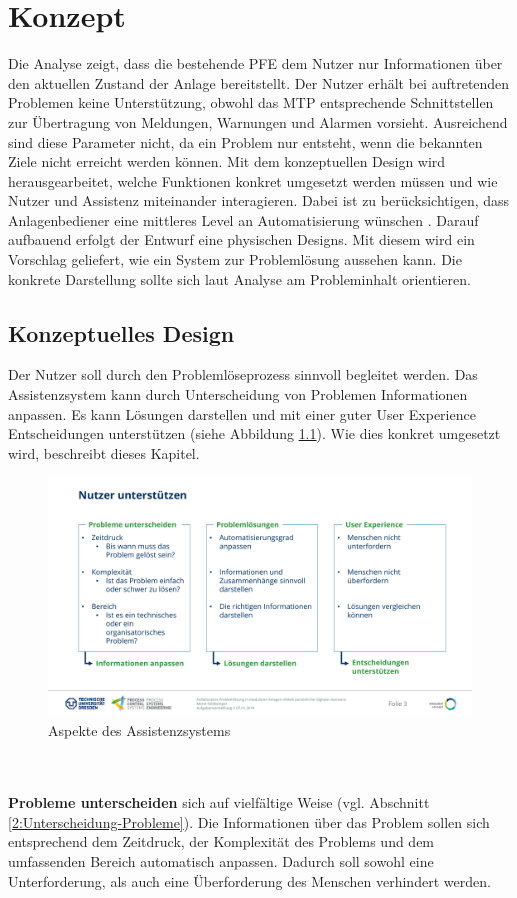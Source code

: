 \chapter{Konzept}
\label{sec:Konzept}
Die Analyse zeigt, dass die bestehende PFE dem Nutzer nur Informationen über den aktuellen Zustand der Anlage bereitstellt. Der Nutzer erhält bei auftretenden Problemen keine Unterstützung, obwohl das MTP entsprechende Schnittstellen zur Übertragung von Meldungen, Warnungen und Alarmen vorsieht. Ausreichend sind diese Parameter nicht, da ein Problem nur entsteht, wenn die bekannten Ziele nicht erreicht werden können. Mit dem konzeptuellen Design wird herausgearbeitet, welche Funktionen konkret umgesetzt werden müssen und wie Nutzer und Assistenz miteinander interagieren. Dabei ist zu berücksichtigen, dass Anlagenbediener eine mittleres Level an Automatisierung wünschen \cite{Sauer2018}. Darauf aufbauend erfolgt der Entwurf eine physischen Designs. Mit diesem wird ein Vorschlag geliefert, wie ein System zur Problemlösung aussehen kann. Die konkrete Darstellung sollte sich laut Analyse am Probleminhalt orientieren.

\section{Konzeptuelles Design}
Der Nutzer soll durch den Problemlöseprozess sinnvoll begleitet werden. Das Assistenzsystem kann durch Unterscheidung von Problemen Informationen anpassen. Es kann Lösungen darstellen und mit einer guter User Experience Entscheidungen unterstützen (siehe Abbildung \ref{pic:Nutzer-Unterstuetzen}). Wie dies konkret umgesetzt wird, beschreibt dieses Kapitel.
\begin{figure}[h!]
\centering
\includegraphics[scale=0.43]{DA_files/Bilder/Konzept/Nutzer-unterstuetzen.pdf}
\caption{Aspekte des Assistenzsystems}
\label{pic:Nutzer-Unterstuetzen}
\end{figure}
\\ \\
\textbf{Probleme unterscheiden} sich auf vielfältige Weise (vgl. Abschnitt \ref{2:Unterscheidung-Probleme}). Die Informationen über das Problem sollen sich entsprechend dem Zeitdruck, der Komplexität des Problems und dem umfassenden Bereich automatisch anpassen. Dadurch soll sowohl eine Unterforderung, als auch eine Überforderung des Menschen verhindert werden.

